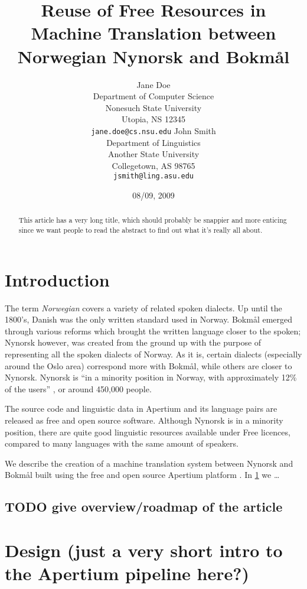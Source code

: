 \documentclass[11pt]{article}
\author{Jane Doe\\  Department of Computer Science \\  Nonesuch State University \\  Utopia, NS 12345 \\  {\tt jane.doe@cs.nsu.edu} \And  John Smith \\  Department of Linguistics \\  Another State University \\  Collegetown, AS 98765 \\    {\tt jsmith@ling.asu.edu}}
\title{Reuse of Free Resources in Machine Translation between Norwegian Nynorsk and Bokmål}
\date{08/09, 2009}
\begin{document}
\maketitle


\begin{abstract}

  This article has a very long title, which should probably be snappier and more enticing since we want people to read the abstract to find out what it's really all about.
\end{abstract}

\section{Introduction}
\label{sec-1}

The term \emph{Norwegian} covers a variety of related spoken dialects. Up
until the 1800's, Danish was the only written standard used in
Norway. Bokmål emerged through various reforms which brought the
written language closer to the spoken; Nynorsk however, was created
from the ground up with the purpose of representing all the spoken
dialects of Norway. As it is, certain dialects (especially around the
Oslo area) correspond more with Bokmål, while others are closer to
Nynorsk. Nynorsk is ``in a minority position in Norway, with
approximately 12\% of the users'' \citep{everson2000sln}, or around
450,000 people. 

The source code and linguistic data in Apertium and its language pairs
are released as free and open source software. Although Nynorsk is in
a minority position, there are quite good linguistic resources
available under Free licences, compared to many languages with the
same amount of speakers. 

We describe the creation of a machine translation system between
Nynorsk and Bokmål built using the free and open source Apertium
platform \citep{corbi05oss}. In \ref{sec-1} we \ldots{}
\subsection{\textbf{TODO} give overview/roadmap of the article}
\label{sec-1.1}




\section{Design (just a very short intro to the Apertium pipeline here?)}
\label{sec-2}
\end{document}
